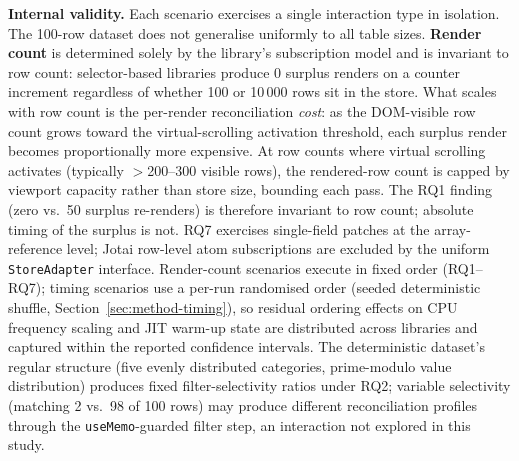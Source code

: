 \documentclass[conference]{IEEEtran}
\newcommand{\code}[1]{\texttt{\small #1}}
\begin{document}
\textbf{Internal validity.} Each scenario exercises a single interaction
type in isolation. The 100-row dataset does not generalise uniformly
to all table sizes.
\textbf{Render count} is determined solely by the library's
subscription model and is invariant to row count: selector-based
libraries produce 0 surplus renders on a counter increment regardless
of whether 100 or 10\,000 rows sit in the store.
What scales with row count is the per-render reconciliation
\emph{cost}: as the DOM-visible row count grows toward the
virtual-scrolling activation threshold, each surplus render becomes
proportionally more expensive.
At row counts where virtual scrolling activates (typically
$>$200--300 visible rows), the rendered-row count is capped by viewport
capacity rather than store size, bounding each pass.
The RQ1 finding (zero vs.\ 50 surplus re-renders) is therefore
invariant to row count; absolute timing of the
surplus is not. RQ7
exercises single-field patches at the array-reference level; Jotai
row-level atom subscriptions are excluded by the uniform
\code{StoreAdapter} interface. Render-count scenarios execute in fixed
order (RQ1--RQ7); timing scenarios use a per-run randomised order
(seeded deterministic shuffle, Section~\ref{sec:method-timing}), so
residual ordering effects on CPU frequency scaling and JIT warm-up state
are distributed across libraries and captured within the reported
confidence intervals. The deterministic dataset's regular structure (five evenly
distributed categories, prime-modulo value distribution) produces fixed
filter-selectivity ratios under RQ2; variable selectivity (matching 2
vs.\ 98 of 100 rows) may produce different reconciliation profiles
through the \code{useMemo}-guarded filter step, an interaction not
explored in this study.
\end{document}

